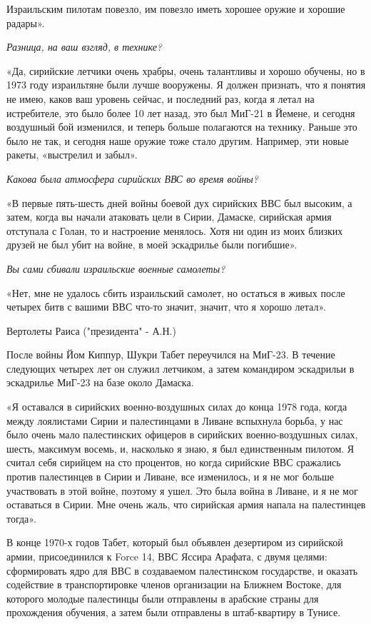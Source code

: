 Израильским пилотам повезло, им повезло иметь хорошее оружие и хорошие радары».

\textit{Разница, на ваш взгляд, в технике?}

«Да, сирийские летчики очень храбры, очень талантливы и хорошо обучены, но в 1973 году израильтяне были лучше вооружены. Я должен признать, что я понятия не имею, каков ваш уровень сейчас, и последний раз, когда я летал на истребителе, это было более 10 лет назад, это был МиГ-21 в Йемене, и сегодня воздушный бой изменился, и теперь больше полагаются на технику. Раньше это было не так, и сегодня наше оружие тоже стало другим. Например, эти новые ракеты, «выстрелил и забыл».

\textit{Какова была атмосфера сирийских ВВС во время войны?}

«В первые пять-шесть дней войны боевой дух сирийских ВВС был высоким, а затем, когда вы начали атаковать цели в Сирии, Дамаске, сирийская армия отступала с Голан, то и настроение менялось. Хотя ни один из моих близких друзей не был убит на войне, в моей эскадрилье были погибшие».

\textit{Вы сами сбивали израильские военные самолеты?}

«Нет, мне не удалось сбить израильский самолет, но остаться в живых после четырех битв с вашими ВВС что-то значит, значит, что я хорошо летал».

Вертолеты Раиса ("президента" - А.Н.)

После войны Йом Киппур, Шукри Табет переучился на МиГ-23. В течение следующих четырех лет он служил летчиком, а затем командиром эскадрильи в эскадрилье МиГ-23 на базе около Дамаска.

«Я оставался в сирийских военно-воздушных силах до конца 1978 года, когда между лоялистами Сирии и палестинцами в Ливане вспыхнула борьба, у нас было очень мало палестинских офицеров в сирийских военно-воздушных силах, шесть, максимум восемь, и, насколько я знаю, я был единственным пилотом. Я считал себя сирийцем на сто процентов, но когда сирийские ВВС сражались против палестинцев в Сирии и Ливане, все изменилось, и я не мог больше участвовать в этой войне, поэтому я ушел. Это была война в Ливане, и я не мог оставаться в Сирии. Мне очень жаль, что сирийская армия напала на палестинцев тогда».

В конце 1970-х годов Табет, который был объявлен дезертиром из сирийской армии, присоединился к Force 14, ВВС Яссира Арафата, с двумя целями: сформировать ядро для ВВС в создаваемом палестинском государстве, и оказать содействие в транспортировке членов организации на Ближнем Востоке, для которого молодые палестинцы были отправлены в арабские страны для прохождения обучения, а затем были отправлены в штаб-квартиру в Тунисе.

